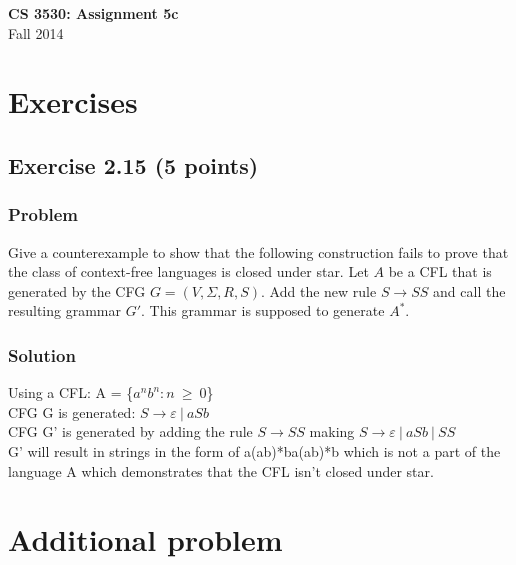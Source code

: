 \documentclass{article}
\begin{document}
\begin{empfile}

\begin{center}
\textbf{\Large CS 3530: Assignment 5c} \\[2mm]
Fall 2014
\end{center}

\raggedright

\section*{Exercises}

\subsection*{Exercise 2.15 (5 points)}

\subsubsection*{Problem}

Give a counterexample to show that the following construction fails
to prove that the class of context-free languages is closed under
star. Let $A$ be a CFL that is generated by the CFG
$G=(V,\Sigma,R,S)$. Add the new rule $S\rightarrow SS$ and call the
resulting grammar $G'$. This grammar is supposed to generate $A^*$.

\subsubsection*{Solution}

Using a CFL: A = \{$a^nb^n: n\ \ge\ 0$\} \\

CFG G is generated: $ S\rightarrow \varepsilon\ |\  aSb $ \\

CFG G' is generated by adding the rule $ S\rightarrow SS$ 
making $ S\rightarrow \varepsilon\ |\  aSb\ |\ SS $ \\

G' will result in strings in the form of a(ab)*ba(ab)*b which is not a part of
the language A which demonstrates that the CFL isn't closed under star.



\section*{Additional problem}


\end{empfile}
\end{document}
